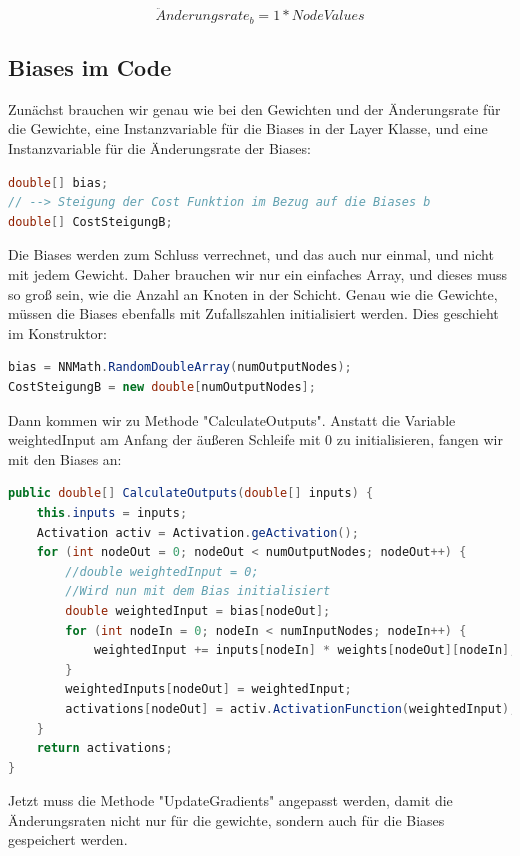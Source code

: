 \documentclass[12pt]{article}
\begin{document}
$$\ddot{A}nderungsrate_b = 1*NodeValues$$\subsection{Biases im Code}Zunächst brauchen wir genau wie bei den Gewichten und der Änderungsrate für die Gewichte, eine Instanzvariable für die Biases in der Layer Klasse, und eine Instanzvariable für die Änderungsrate der Biases:\begin{lstlisting}[language=Java]
double[] bias;
// --> Steigung der Cost Funktion im Bezug auf die Biases b
double[] CostSteigungB;
\end{lstlisting}Die Biases werden zum Schluss verrechnet, und das auch nur einmal, und nicht mit jedem Gewicht. Daher brauchen wir nur ein einfaches Array, und dieses muss so groß sein, wie die Anzahl an Knoten in der Schicht. Genau wie die Gewichte, müssen die Biases ebenfalls mit Zufallszahlen initialisiert werden. Dies geschieht im Konstruktor:\begin{lstlisting}[language=Java]
bias = NNMath.RandomDoubleArray(numOutputNodes);
CostSteigungB = new double[numOutputNodes];
\end{lstlisting}Dann kommen wir zu Methode "CalculateOutputs". Anstatt die Variable weightedInput am Anfang der äußeren Schleife mit 0 zu initialisieren, fangen wir mit den Biases an:\begin{lstlisting}[language=Java]
public double[] CalculateOutputs(double[] inputs) {
    this.inputs = inputs;
    Activation activ = Activation.geActivation();
    for (int nodeOut = 0; nodeOut < numOutputNodes; nodeOut++) {
        //double weightedInput = 0;
        //Wird nun mit dem Bias initialisiert
        double weightedInput = bias[nodeOut];
        for (int nodeIn = 0; nodeIn < numInputNodes; nodeIn++) {
            weightedInput += inputs[nodeIn] * weights[nodeOut][nodeIn];
        }
        weightedInputs[nodeOut] = weightedInput;
        activations[nodeOut] = activ.ActivationFunction(weightedInput);
    }
    return activations;
}
\end{lstlisting}Jetzt muss die Methode "UpdateGradients" angepasst werden, damit die Änderungsraten nicht nur für die gewichte, sondern auch für die Biases gespeichert werden.
\end{document}
